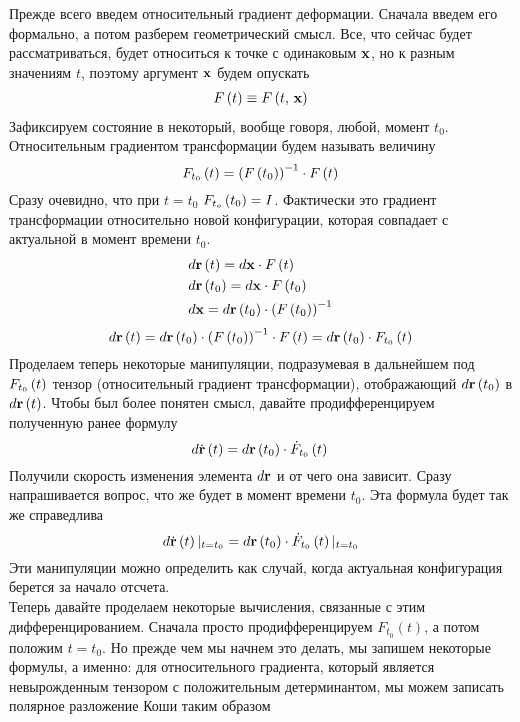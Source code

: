 \documentclass[a4papper, 14pt]{book}
\newcommand{\lf}{\ensuremath \left(}
\newcommand{\ri}{\ensuremath \right)}
\newcommand{\mf}[1]{\ensuremath\mathbf{#1}}
\theoremstyle{plain} %
\theoremstyle{definition} %
\theoremstyle{remark} %
\begin{document}
	Прежде всего введем относительный градиент деформации. Сначала введем его формально, а потом разберем геометрический смысл. Все, что сейчас будет рассматриваться, будет относиться к точке с одинаковым $\mf{x}$, но к разным значениям $t$, поэтому аргумент $\mf{x}$ будем опускать
	\begin{align}
	F\left(t\right)  \equiv F\lf t,\, \mf{x}\ri
	\end{align}
	Зафиксируем состояние в некоторый, вообще говоря, любой, момент $t_0$. Относительным градиентом трансформации будем называть величину
	\begin{equation}
	F_{t_0}\lf t \ri = {\lf F\lf t_0 \ri\ri}^{-1} \cdot F\lf t \ri 
	\end{equation}
	Сразу очевидно, что при $t = t_0$ $F_{t_o} \lf t_0 \ri = I$. Фактически это градиент трансформации относительно новой конфигурации, которая совпадает с актуальной в момент времени $t_0$.
	\begin{align}
	&d\mf{r}\lf t\ri = d\mf{x} \cdot F\lf t \ri\\
	&d\mf{r}\lf t_0\ri = d\mf{x} \cdot F\lf t_0 \ri\\
	&d\mf{x} = d\mf{r}\lf t_0\ri \cdot {(F\lf t_0\ri)}^{-1}
	\end{align}
	\begin{equation}
	d\mf{r}\lf t\ri = d\mf{r}\lf t_0\ri \cdot {(F\lf t_0\ri)}^{-1} \cdot F\lf t \ri = d\mf{r}\lf t_0\ri \cdot F_{t_0}\lf t\ri
	\end{equation}
	Проделаем теперь некоторые манипуляции, подразумевая в дальнейшем под $F_{t_0}\lf t\ri$ тензор (относительный градиент трансформации), отображающий $d\mf{r}\lf t_0\ri$ в $d\mf{r}\lf t\ri$. Чтобы был более понятен смысл, давайте продифференцируем полученную ранее формулу
	\begin{equation}
	d\dot{\mf{r}}\lf t\ri = d\mf{r}\lf t_0\ri \cdot \dot{F}_{t_0}\lf t\ri\\
	\end{equation}
	Получили скорость изменения элемента $d\mf{r}$ и от чего она зависит. Сразу напрашивается вопрос, что же будет в момент времени $t_0$. Эта формула будет так же справедлива
	\begin{equation}\label{eq: dr/dt t=t0}
	d\dot{\mf{r}}\lf t\ri\vert_{t = t_0} = d\mf{r}\lf t_0\ri \cdot \dot{F}_{t_0}\lf t\ri\vert_{t = t_0}
	\end{equation}
	Эти манипуляции можно определить как случай, когда актуальная конфигурация берется за начало отсчета.\\
	Теперь давайте проделаем некоторые вычисления, связанные с этим дифференцированием. Сначала просто продифференцируем $F_{t_0}(t)$, а потом положим $t=t_0$. Но прежде чем мы начнем это делать, мы запишем некоторые формулы, а именно: для относительного градиента, который является невырожденным тензором с положительным детерминантом, мы можем записать полярное разложение Коши таким образом
\end{document}
